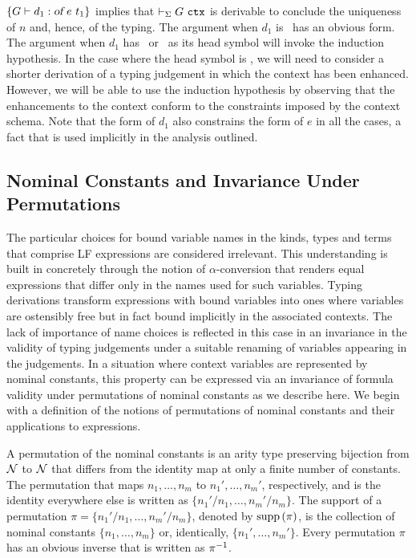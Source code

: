 $\left\{G \vdash d_1 : \mbox{\sl of}\  e\  t_1\right\}$ implies that $\vdash_{\Sigma} G\ \mbox{\tt ctx}$ is
derivable to conclude the uniqueness of $n$ and, hence, of the typing.
%
The argument when $d_1$ is \ofemptytm\ has an obvious form.
%
The argument when $d_1$ has \ofapptm\ or \oflamtm\ as its head symbol
will invoke the induction hypothesis. 
%
In the case where the head symbol is \oflamtm, we will need
to consider a shorter derivation of a typing judgement in which the
context has been enhanced.
%
However, we will be able to use the induction hypothesis by observing
that the enhancements to the context conform to the constraints
imposed by the context schema. 
%
Note that the form of $d_1$ also constrains the form of $e$ in all the
cases, a fact that is used implicitly in the analysis outlined.

\subsection{Nominal Constants and Invariance Under Permutations}
\label{ssec:permutations}

The particular choices for bound variable names in the kinds, types
and terms that comprise LF expressions are considered irrelevant.
%
This understanding is built in concretely through the notion of
$\alpha$-conversion that renders equal expressions that differ
only in the names used for such variables.
%
Typing derivations transform expressions with bound variables into
ones where variables are ostensibly free but in fact bound implicitly
in the associated contexts.
%
The lack of importance of name choices is reflected in this case in an
invariance in the validity of typing judgements under a suitable
renaming of variables appearing in the judgements.
%
In a situation where context variables are represented by nominal
constants, this property can be expressed via an invariance of formula
validity under permutations of nominal constants as we describe here.
%
We begin with a definition of the notions of permutations of
nominal constants and their applications to expressions. 
\begin{definition}%

A permutation of the nominal constants is an arity type preserving
bijection from $\mathcal{N}$ to $\mathcal{N}$ that differs from the identity
map at only a finite number of constants. 
%
The permutation that maps $n_1,\ldots, n_m$ to $n_1',\ldots,n_m'$,
respectively, and is the identity everywhere else is written as 
$\{n_1'/n_1,\ldots,n_m'/n_m\}$.
%
The support of a permutation $\pi=\{n_1'/n_1,\ldots,n_m'/n_m\}$, 
denoted by $\text{supp}\left({\pi}\right)$, is the collection of nominal constants
$\{n_1,\ldots, n_m\}$ or, identically, $\{n_1',\ldots,n_m'\}$.
%
Every permutation $\pi$ has an obvious inverse that is written as
${\pi}^{-1}$. 
\end{definition}

